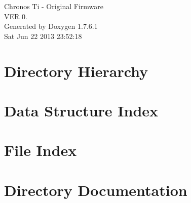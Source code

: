 \documentclass[a4paper]{book}
\begin{document}
\hypersetup{pageanchor=false,citecolor=blue}
\begin{titlepage}
\vspace*{7cm}
\begin{center}
{\Large \-Chronos \-Ti -\/ \-Original \-Firmware \\[1ex]\large \-V\-E\-R 0. }\\
\vspace*{1cm}
{\large \-Generated by Doxygen 1.7.6.1}\\
\vspace*{0.5cm}
{\small Sat Jun 22 2013 23:52:18}\\
\end{center}
\end{titlepage}
\clearemptydoublepage
{}
\tableofcontents
\clearemptydoublepage
{}
\hypersetup{pageanchor=true,citecolor=blue}
\chapter{\-Directory \-Hierarchy}

\chapter{\-Data \-Structure \-Index}

\chapter{\-File \-Index}

\chapter{\-Directory \-Documentation}

























\end{document}
